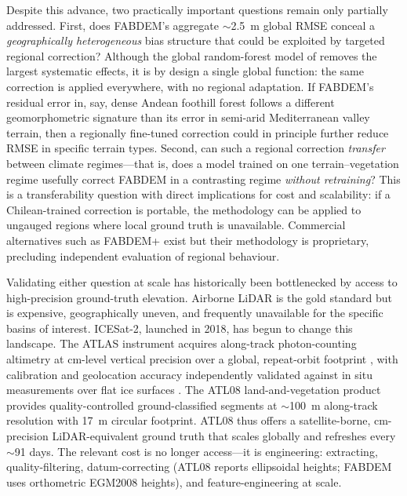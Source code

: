 \documentclass[preprint,authoryear,number]{elsarticle}
\begin{document}
Despite this advance, two practically important questions remain only partially addressed. First, does FABDEM's aggregate $\sim$\SI{2.5}{\meter} global RMSE conceal a \emph{geographically heterogeneous} bias structure that could be exploited by targeted regional correction? Although the global random-forest model of \citet{Hawker2022FABDEM} removes the largest systematic effects, it is by design a single global function: the same correction is applied everywhere, with no regional adaptation. If FABDEM's residual error in, say, dense Andean foothill forest follows a different geomorphometric signature than its error in semi-arid Mediterranean valley terrain, then a regionally fine-tuned correction could in principle further reduce RMSE in specific terrain types. Second, can such a regional correction \emph{transfer} between climate regimes---that is, does a model trained on one terrain--vegetation regime usefully correct FABDEM in a contrasting regime \emph{without retraining}? This is a transferability question with direct implications for cost and scalability: if a Chilean-trained correction is portable, the methodology can be applied to ungauged regions where local ground truth is unavailable. Commercial alternatives such as FABDEM+ \citep{Fathom2024FABDEMPlus} exist but their methodology is proprietary, precluding independent evaluation of regional behaviour.

Validating either question at scale has historically been bottlenecked by access to high-precision ground-truth elevation. Airborne LiDAR is the gold standard but is expensive, geographically uneven, and frequently unavailable for the specific basins of interest. ICESat-2, launched in 2018, has begun to change this landscape. The ATLAS instrument acquires along-track photon-counting altimetry at cm-level vertical precision over a global, repeat-orbit footprint \citep{Markus2017ICESat2}, with calibration and geolocation accuracy independently validated against in situ measurements over flat ice surfaces \citep{Brunt2021ICESat2Accuracy,Magruder2021ICESat2Performance}. The ATL08 land-and-vegetation product \citep{Neuenschwander2019ATL08} provides quality-controlled ground-classified segments at $\sim$\SI{100}{\meter} along-track resolution with \SI{17}{\meter} circular footprint. ATL08 thus offers a satellite-borne, cm-precision LiDAR-equivalent ground truth that scales globally and refreshes every $\sim$91 days. The relevant cost is no longer access---it is engineering: extracting, quality-filtering, datum-correcting (ATL08 reports ellipsoidal heights; FABDEM uses orthometric EGM2008 heights), and feature-engineering at scale.
\end{document}
